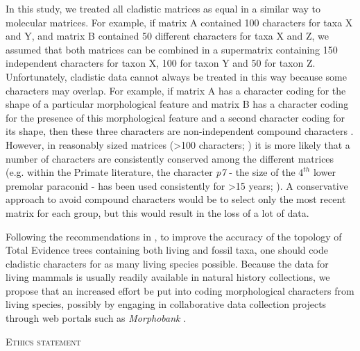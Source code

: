 \documentclass[12pt,letterpaper]{article}
\renewcommand{\section}[1]{%
\bigskip
\begin{center}
\begin{Large}
\normalfont\scshape #1
\medskip
\end{Large}
\end{center}}
\begin{document}
In this study, we treated all cladistic matrices as equal in a similar way to molecular matrices. 
For example, if matrix A contained 100 characters for taxa X and Y, and matrix B contained 50 different characters for taxa X and Z, we assumed that both matrices can be combined in a supermatrix containing 150 independent characters for taxon X, 100 for taxon Y and 50 for taxon Z.
Unfortunately, cladistic data cannot always be treated in this way because some characters may overlap.
For example, if matrix A has a character coding for the shape of a particular morphological feature and matrix B has a character coding for the presence of this morphological feature and a second character coding for its shape, then these three characters are non-independent compound characters \citep{Brazeau2011}.
However, in reasonably sized matrices (\textgreater 100 characters; \citealp{GuillermeCooper,harrisonamong-character2014}) it is more likely that a number of characters are consistently conserved among the different matrices (e.g. within the Primate literature, the character \textit{p7} - the size of the $4^{th}$ lower premolar paraconid - has been used consistently for \textgreater 15 years; \citealp[e.g.][]{ross1998phylogenetic,seiffert2003fossil,marivaux2005anthropoid,seiffert2005basal,bloch2007new,kay2008anatomy,silcox2008biogeographic,seiffert2009convergent,tabuce2009anthropoid,boyer2010astragalar,seiffert2010fossil,marivaux2013djebelemur,ni2013oldest}). %
A conservative approach to avoid compound characters would be to select only the most recent matrix for each group, but this would result in the loss of a lot of data.

Following the recommendations in \citep{GuillermeCooper}, to improve the accuracy of the topology of Total Evidence trees containing both living and fossil taxa, one should code cladistic characters for as many living species possible. 
Because the data for living mammals is usually readily available in natural history collections, we propose that an increased effort be put into coding morphological characters from living species, possibly by engaging in collaborative data collection projects through web portals such as \textit{Morphobank} \citep{morphobank}.


\section{Ethics statement}
\end{document}
